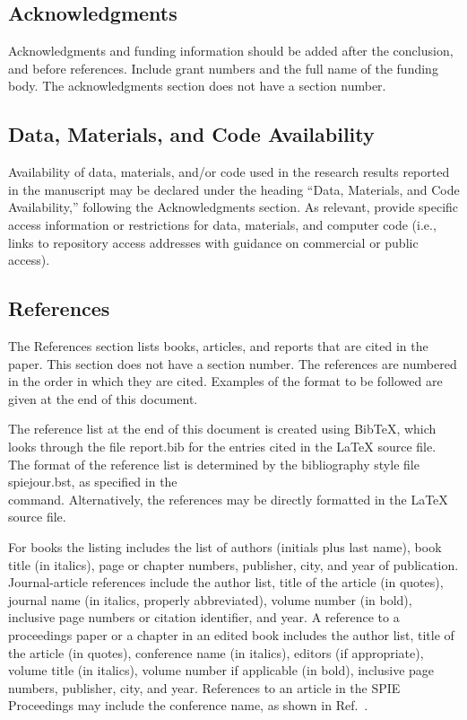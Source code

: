 \documentclass[12pt]{spieman}  %
\begin{document}
\begin{spacing}{2}
\subsection{Acknowledgments}
Acknowledgments and funding information should be added after the conclusion, and before references. Include grant numbers and the full name of the funding body. The acknowledgments section does not have a section number.

\subsection{Data, Materials, and Code Availability}
Availability of data, materials, and/or code used in the research results reported in the manuscript may be declared under the heading ``Data, Materials, and Code Availability,'' following the Acknowledgments section. As relevant, provide specific access information or restrictions for data, materials, and computer code (i.e., links to repository access addresses with guidance on commercial or public access).

\subsection{References}
The References section lists books, articles, and reports that are cited in the paper. This section does not have a section number. The references are numbered in the order in which they are cited. Examples of the format to be followed are given at the end of this document.

The reference list at the end of this document is created using BibTeX, which looks through the file {\ttfamily report.bib} for the entries cited in the LaTeX source file.  The format of the reference list is determined by the bibliography style file {\ttfamily spiejour.bst}, as specified in the \\ \verb|| command.  Alternatively, the references may be directly formatted in the LaTeX source file.

For books the listing includes the list of authors (initials plus last name), book title (in italics), page or chapter numbers, publisher, city, and year of publication.  Journal-article references  include the author list, title of the article (in quotes), journal name (in italics, properly abbreviated), volume number (in bold), inclusive page numbers or citation identifier, and year.  A reference to a proceedings paper or a chapter in an edited book includes the author list, title of the article (in quotes), conference name (in italics), editors (if appropriate), volume title (in italics), volume number if applicable (in bold), inclusive page numbers, publisher, city, and year.  References to an article in the SPIE Proceedings may include the conference name, as shown in Ref.~.


\end{spacing}
\end{document}
